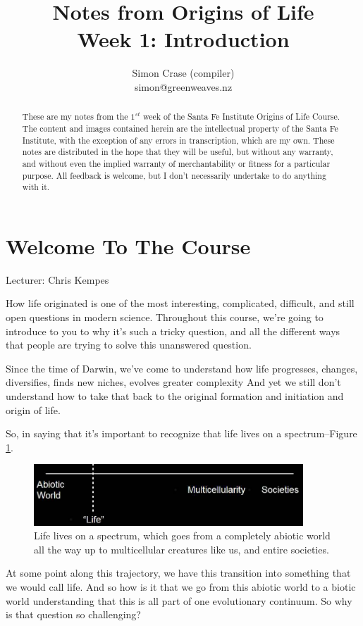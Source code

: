 \documentclass[]{article}
\title{
	Notes from Origins of Life\\
	Week 1: Introduction
}
\author{Simon Crase (compiler)\\simon@greenweaves.nz}
\begin{document}
\maketitle

\begin{abstract}
    These are my notes from the $1^{st}$ week of the Santa Fe Institute Origins of Life Course\cite{sfi2020}.\\
    The content and images contained herein are the intellectual property of the Santa Fe Institute, with the exception of any errors in transcription, which are my own.
    These notes are distributed in the hope that they will be useful,
    but without any warranty, and without even the implied warranty of
     merchantability or fitness for a particular purpose. All feedback is welcome,
    but I don't necessarily undertake to do anything with it.
\end{abstract}

\setcounter{tocdepth}{2}
\tableofcontents
\listoffigures

\section{Welcome To The Course}

Lecturer: Chris Kempes

How life originated is one of the most interesting, complicated, difficult, and still open questions in modern science. Throughout this course, we're going to
introduce to you to why it's such a tricky question, and all the different ways that people are trying to solve this unanswered question.	

Since the time of Darwin, we've come to understand how life
progresses, changes, diversifies, finds new niches, evolves greater complexity
And yet we still don't understand how to take that back to
the original formation and initiation and origin of life.


So, in saying that it's important to recognize that life lives on a spectrum--Figure \ref{fig:lifesTransitions}.

\begin{figure}[H]
	\caption[Life lives on a spectrum]{Life lives on a spectrum, which goes from a completely abiotic world
		all the way up to multicellular creatures like us, and entire societies.}\label{fig:lifesTransitions}
	\includegraphics[width=0.9\textwidth]{lifesTransitions}
\end{figure}
At some point along this trajectory, we have this transition into something
that we would call life. And so how is it that we go from this
abiotic world to a biotic world understanding that this is all part of one
evolutionary continuum. So why is that question so challenging?
\end{document}
